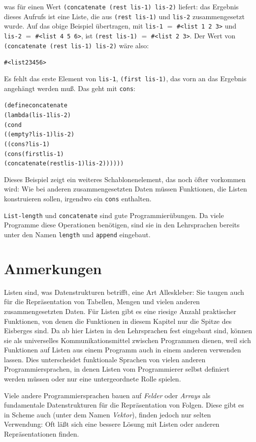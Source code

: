 was für einen Wert \texttt{(concatenate (rest lis-1) lis-2)} liefert: das Ergebnis
dieses Aufrufs ist eine
Liste, die aus \texttt{(rest lis-1)} und \texttt{lis-2} zusammengesetzt
wurde.  Auf das obige Beispiel übertragen, mit \texttt{lis-1} $=$
\verb|#<list 1 2 3>| und \texttt{lis-2} $=$
\verb|#<list 4 5 6>|, ist \texttt{(rest lis-1)} $=$ \verb|#<list 2 3>|.
Der Wert von \texttt{(concatenate (rest lis-1) lis-2)} wäre
also:
%
\begin{alltt}
#<list 2 3 4 5 6>
\end{alltt}
%
Es fehlt das erste Element von \texttt{lis-1}, \texttt{(first
  lis-1)}, das vorn an das Ergebnis angehängt werden muß.  Das geht
mit \texttt{cons}:
%
\begin{alltt}
(define concatenate
  (lambda (lis-1 lis-2)
    (cond
      ((empty? lis-1) lis-2)
      ((cons? lis-1) 
       (cons (first lis-1)
                  (concatenate (rest lis-1) lis-2))))))
\end{alltt}
%
Dieses Beispiel zeigt ein weiteres Schablonenelement, das noch öfter
vorkommen wird:  Wie bei anderen zusammengesetzten Daten müssen Funktionen, die
Listen konstruieren sollen, irgendwo ein \texttt{cons} enthalten.

\texttt{List-length} und \texttt{concatenate} sind gute
Programmierübungen.  Da viele Programme diese Operationen benötigen,
sind sie in den Lehrsprachen  bereits unter den Namen
\texttt{length} und
\texttt{append} eingebaut.


\section*{Anmerkungen}

Listen sind, was Datenstrukturen betrifft, eine Art Alleskleber:
Sie taugen auch für die Repräsentation von Tabellen,
Mengen und vielen anderen zusammengesetzten Daten.  Für Listen gibt es
eine riesige Anzahl praktischer Funktionen, von denen die Funktionen in
diesem Kapitel nur die Spitze des Eisberges sind.  Da 
ab hier Listen in den Lehrsprachen fest eingebaut sind, können sie als universelles
Kommunikationsmittel zwischen Programmen dienen, weil sich Funktionen
auf Listen aus einem Programm auch in einem anderen verwenden lassen.
Dies unterscheidet funktionale Sprachen von vielen anderen Programmiersprachen, in
denen Listen vom Programmierer selbst definiert werden müssen oder nur
eine untergeordnete Rolle spielen.

Viele andere Programmiersprachen bauen auf \textit{Felder} oder
\textit{Arrays} als fundamentale Datenstrukturen für die
Repräsentation von Folgen.  Diese gibt es in
Scheme auch (unter dem Namen \textit{Vektor}), finden jedoch
nur selten Verwendung: Oft läßt sich eine
bessere Lösung mit Listen oder anderen Repräsentationen finden.

